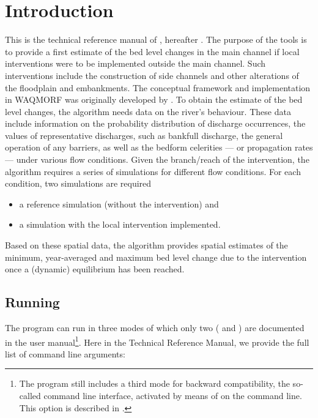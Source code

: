 \chapter{Introduction}

This is the technical reference manual of \dfastmi, hereafter \dfmi.
The purpose of the tools is to provide a first estimate of the bed level changes in the main channel if local interventions were to be implemented outside the main channel.
Such interventions include the construction of side channels and other alterations of the floodplain and embankments.
The conceptual framework and implementation in WAQMORF was originally developed by \citep{Sieben2008}.
To obtain the estimate of the bed level changes, the algorithm needs data on the river's behaviour.
These data include information on the probability distribution of discharge occurrences, the values of representative discharges, such as bankfull discharge, the general operation of any barriers, as well as the bedform celerities --- or propagation rates --- under various flow conditions.
Given the branch/reach of the intervention, the algorithm requires a series of \dflowfm simulations for different flow conditions.
For each condition, two simulations are required

\begin{itemize}
\item a reference simulation (without the intervention) and
\item a simulation with the local intervention implemented.
\end{itemize}

Based on these spatial data, the algorithm provides spatial estimates of the minimum, year-averaged and maximum bed level change due to the intervention once a (dynamic) equilibrium has been reached.

\section{Running \dfmi}

The program can run in three modes of which only two ( and ) are documented in the user manual\footnote{\label{fn:backward1}The program still includes a third mode for backward compatibility, the so-called command line interface, activated by means of  on the command line.
This option is described in .}.
Here in the Technical Reference Manual, we provide the full list of command line arguments:

